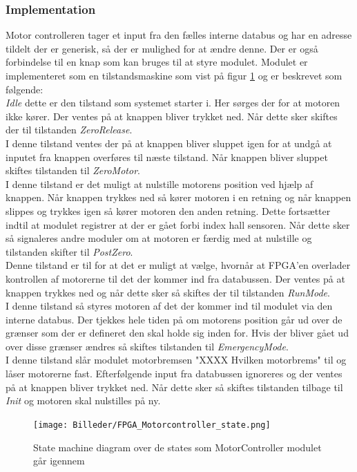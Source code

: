 \subsubsection{Implementation}
Motor controlleren tager et input fra den fælles interne databus og har en adresse tildelt der er generisk, så der er mulighed for at ændre denne. Der er også forbindelse til en knap som kan bruges til at styre modulet. Modulet er implementeret som en tilstandsmaskine som vist på figur \ref{fig:FPGA_MotorController_State} og er beskrevet som følgende:\\
\textit{Idle} dette er den tilstand som systemet starter i. Her sørges der for at motoren ikke kører. Der ventes på at knappen bliver trykket ned. Når dette sker skiftes der til tilstanden \textit{ZeroRelease}.\\
I denne tilstand ventes der på at knappen bliver sluppet igen for at undgå at inputet fra knappen overføres til næste tilstand. Når knappen bliver sluppet skiftes tilstanden til \textit{ZeroMotor}.\\ 
I denne tilstand er det muligt at nulstille motorens position ved hjælp af knappen. Når knappen trykkes ned så kører motoren i en retning og når knappen slippes og trykkes igen så kører motoren den anden retning. Dette fortsætter indtil at modulet registrer at der er gået forbi index hall sensoren. Når dette sker så signaleres andre moduler om at motoren er færdig med at nulstille og tilstanden skifter til \textit{PostZero}.\\
Denne tilstand er til for at det er muligt at vælge, hvornår at FPGA'en overlader kontrollen af motorerne til det der kommer ind fra databussen. Der ventes på at knappen trykkes ned og når dette sker så skiftes der til tilstanden \textit{RunMode}. \\
I denne tilstand så styres motoren af det der kommer ind til modulet via den interne databus. Der tjekkes hele tiden på om motorens position går ud over de grænser som der er defineret den skal holde sig inden for. Hvis der bliver gået ud over disse grænser ændres så skiftes tilstanden til \textit{EmergencyMode}.\\
I denne tilstand slår modulet motorbremsen "XXXX Hvilken motorbrems" til og låser motorerne fast. Efterfølgende input fra databussen ignoreres og der ventes på at knappen bliver trykket ned. Når dette sker så skiftes tilstanden tilbage til \textit{Init} og motoren skal nulstilles på ny.

\begin{figure}[ht]
	\begin{center}
		\texttt{[image: Billeder/FPGA\_Motorcontroller\_state.png]}
	\end{center}
\caption{State machine diagram over de states som MotorController modulet går igennem}
\label{fig:FPGA_MotorController_State}
\end{figure}

